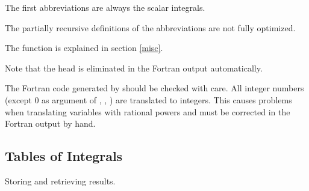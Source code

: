 {The first abbreviations are always the scalar integrals.

The partially recursive definitions of the
abbreviations are not fully optimized.

The function  is explained in section \ref{misc}.

Note that the head  is eliminated in the
Fortran output automatically.
}
\enom
The Fortran code generated by  should be checked with care.
All integer numbers (except 0 as argument of , , )
are translated to integers. This causes problems when translating
variables with rational powers and must be corrected in the Fortran
output by hand.

\subsection{Tables of Integrals}

 {Storing and retrieving results.}

